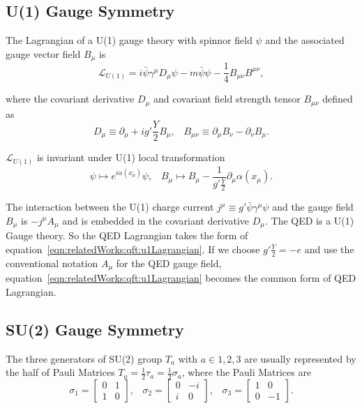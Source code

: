 \subsection{U(1) Gauge Symmetry}
The Lagrangian of a U(1) gauge theory with spinnor field $\psi$ and the associated gauge vector field $B_\mu$ is
% 
\begin{equation}
    \mathcal{L}_{U(1)} = i\bar{\psi}\gamma^\mu D_\mu \psi  - m\bar{\psi} \psi  - \frac{1}{4}B_{\mu\nu}B^{\mu\nu},
    \label{eqn:relatedWorks:qft:u1Lagrangian}
\end{equation}

\noindent where the covariant derivative $D_\mu$ and covariant field strength tensor $B_{\mu\nu}$ defined as
% 
\begin{equation}
    D_\mu \equiv \partial_\mu +i g' \frac{Y}{2} B_\mu , \;\;\; 
    B_{\mu\nu} \equiv  \partial_\mu B_\nu - \partial_\nu B_\mu.
\end{equation}

\noindent $\mathcal{L}_{U(1)}$ is invariant under U(1) local transformation
% 
\begin{equation}
	\psi \longmapsto e^{i\alpha(x_\mu)} \psi ,\;\;\; 
	B_\mu  \longmapsto  B_\mu - \frac{1}{g'\frac{Y}{2}}\partial_\mu \alpha(x_\mu).
\end{equation}

\noindent The interaction between the U(1) charge current $j^\mu \equiv g' \bar{\psi}\gamma^\mu \psi$ and the gauge field $B_\mu$ is $-j^\mu A_\mu$ and is embedded in the covariant derivative $D_\mu$. The QED is a U(1) Gauge theory. So the QED Lagrangian takes the form of equation~\ref{eqn:relatedWorks:qft:u1Lagrangian}. If we choose $g'\frac{Y}{2} = -e$ and use the conventional notation $A_\mu$ for the QED gauge field, equation~\ref{eqn:relatedWorks:qft:u1Lagrangian} becomes the common form of QED Lagrangian.


\subsection{SU(2) Gauge Symmetry}

The three generators of SU(2) group $T_a$ with $a \in {1,2,3 }$ are usually represented by the half of Pauli Matrices $T_a = \frac{1}{2} \tau_a = \frac{1}{2} \sigma_a$, where the Pauli Matrices are 
%
\begin{equation}
    \sigma_1 = \begin{bmatrix} 0 & 1 \\ 1 & 0\end{bmatrix}, \;\;\; 
    \sigma_2 = \begin{bmatrix} 0 & -i \\ i & 0\end{bmatrix}, \;\;\; 
    \sigma_3 = \begin{bmatrix} 1 & 0 \\ 0 & -1\end{bmatrix}.
\end{equation}

